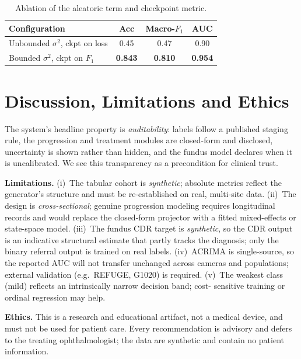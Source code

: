 \documentclass[10pt,twocolumn]{article}
\begin{document}
\begin{table}[t]
\centering
\caption{Ablation of the aleatoric term and checkpoint metric.}
\label{tab:ablation}
\small
\begin{tabular}{lccc}
\toprule
Configuration & Acc & Macro-$F_1$ & AUC \\
\midrule
Unbounded $\sigma^2$, ckpt on loss & 0.45 & 0.47 & 0.90 \\
Bounded $\sigma^2$, ckpt on $F_1$  & \textbf{0.843} & \textbf{0.810} & \textbf{0.954} \\
\bottomrule
\end{tabular}
\end{table}

\section{Discussion, Limitations and Ethics}
The system's headline property is \emph{auditability}: labels follow a published
staging rule, the progression and treatment modules are closed-form and disclosed,
uncertainty is shown rather than hidden, and the fundus model declares when it is
uncalibrated. We see this transparency as a precondition for clinical trust.

\textbf{Limitations.} (i)~The tabular cohort is \emph{synthetic}; absolute metrics
reflect the generator's structure and must be re-established on real, multi-site data.
(ii)~The design is \emph{cross-sectional}; genuine progression modeling requires
longitudinal records and would replace the closed-form projector with a fitted
mixed-effects or state-space model. (iii)~The fundus CDR target is \emph{synthetic},
so the CDR output is an indicative structural estimate that partly tracks the
diagnosis; only the binary referral output is trained on real labels. (iv)~ACRIMA is
single-source, so the reported AUC will not transfer unchanged across cameras and
populations; external validation (e.g.\ REFUGE, G1020) is required.
(v)~The weakest class (mild) reflects an intrinsically narrow decision band; cost-
sensitive training or ordinal regression may help.

\textbf{Ethics.} This is a research and educational artifact, not a medical device,
and must not be used for patient care. Every recommendation is advisory and defers to
the treating ophthalmologist; the data are synthetic and contain no patient
information.

\end{document}

